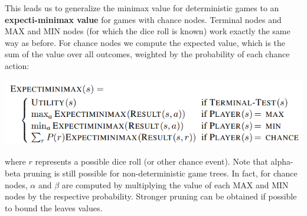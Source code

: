 This leads us to generalize the minimax value for deterministic games to an \textbf{expecti-minimax value} for games with chance nodes. Terminal nodes and MAX and MIN nodes (for which the dice roll is known) work exactly the same way as before. For chance nodes we compute the expected value, which is the sum of the value over all outcomes, weighted by the probability of each chance action:
\begin{center}
    \includegraphics[]{images/expectiminimax.png}
\end{center}
where $r$ represents a possible dice roll (or other chance event).\newline\newline
Note that alpha-beta pruning is still possible for non-deterministic game trees. In fact, for chance nodes, $\alpha$ and $\beta$ are computed by multiplying the value of each MAX and MIN nodes by the respective probability. Stronger pruning can be obtained if possible to bound the leaves values.

